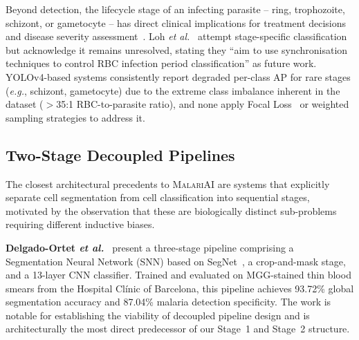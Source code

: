 \documentclass[10pt,twocolumn]{article}
\newcommand{\eg}{\textit{e.g.}}
\newcommand{\etal}{\textit{et al.}}
\newcommand{\malariai}{\textsc{MalariAI}}
\begin{document}
Beyond detection, the lifecycle stage of an infecting parasite --
ring, trophozoite, schizont, or gametocyte -- has direct clinical
implications for treatment decisions and disease severity assessment~\cite{delves2012}.
Loh \etal~\cite{loh2021} attempt stage-specific classification but
acknowledge it remains unresolved, stating they ``aim to use synchronisation
techniques to control RBC infection period classification'' as future
work. YOLOv4-based systems consistently report degraded per-class AP
for rare stages (\eg, schizont, gametocyte) due to the extreme class
imbalance inherent in the dataset ($>$35:1 RBC-to-parasite ratio),
and none apply Focal Loss~\cite{lin2017focal} or weighted sampling
strategies to address it.


\subsection{Two-Stage Decoupled Pipelines}
\label{ssec:twostage}

The closest architectural precedents to \malariai{} are systems that
explicitly separate cell segmentation from cell classification into
sequential stages, motivated by the observation that these are
biologically distinct sub-problems requiring different inductive biases.

\textbf{Delgado-Ortet \etal}~\cite{delgado2020} present a three-stage
pipeline comprising a Segmentation Neural Network (SNN) based on
SegNet~\cite{badrinarayanan2017}, a crop-and-mask stage, and a 13-layer
CNN classifier. Trained and evaluated on MGG-stained thin blood smears
from the Hospital Cl\'inic of Barcelona, this pipeline achieves 93.72\%
global segmentation accuracy and 87.04\% malaria detection specificity.
The work is notable for establishing the viability of decoupled pipeline
design and is architecturally the most direct predecessor of our Stage~1
and Stage~2 structure.
\end{document}
